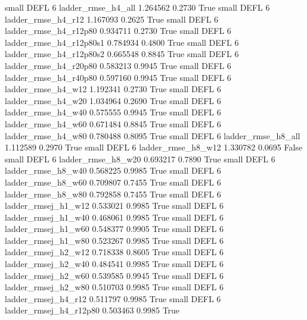      small     DEFL                 6       ladder_rmse_h4_all   1.264562      0.2730    True
     small     DEFL                 6       ladder_rmse_h4_r12   1.167093      0.2625    True
     small     DEFL                 6    ladder_rmse_h4_r12p80   0.934711      0.2730    True
     small     DEFL                 6  ladder_rmse_h4_r12p80s1   0.784934      0.4800    True
     small     DEFL                 6  ladder_rmse_h4_r12p80s2   0.665548      0.8845    True
     small     DEFL                 6    ladder_rmse_h4_r20p80   0.583213      0.9945    True
     small     DEFL                 6    ladder_rmse_h4_r40p80   0.597160      0.9945    True
     small     DEFL                 6       ladder_rmse_h4_w12   1.192341      0.2730    True
     small     DEFL                 6       ladder_rmse_h4_w20   1.034964      0.2690    True
     small     DEFL                 6       ladder_rmse_h4_w40   0.575555      0.9945    True
     small     DEFL                 6       ladder_rmse_h4_w60   0.671484      0.8845    True
     small     DEFL                 6       ladder_rmse_h4_w80   0.780488      0.8095    True
     small     DEFL                 6       ladder_rmse_h8_all   1.112589      0.2970    True
     small     DEFL                 6       ladder_rmse_h8_w12   1.330782      0.0695   False
     small     DEFL                 6       ladder_rmse_h8_w20   0.693217      0.7890    True
     small     DEFL                 6       ladder_rmse_h8_w40   0.568225      0.9985    True
     small     DEFL                 6       ladder_rmse_h8_w60   0.709807      0.7455    True
     small     DEFL                 6       ladder_rmse_h8_w80   0.792858      0.7455    True
     small     DEFL                 6      ladder_rmsej_h1_w12   0.533021      0.9985    True
     small     DEFL                 6      ladder_rmsej_h1_w40   0.468061      0.9985    True
     small     DEFL                 6      ladder_rmsej_h1_w60   0.548377      0.9905    True
     small     DEFL                 6      ladder_rmsej_h1_w80   0.523267      0.9985    True
     small     DEFL                 6      ladder_rmsej_h2_w12   0.718338      0.8605    True
     small     DEFL                 6      ladder_rmsej_h2_w40   0.484541      0.9985    True
     small     DEFL                 6      ladder_rmsej_h2_w60   0.539585      0.9945    True
     small     DEFL                 6      ladder_rmsej_h2_w80   0.510703      0.9985    True
     small     DEFL                 6      ladder_rmsej_h4_r12   0.511797      0.9985    True
     small     DEFL                 6   ladder_rmsej_h4_r12p80   0.503463      0.9985    True
